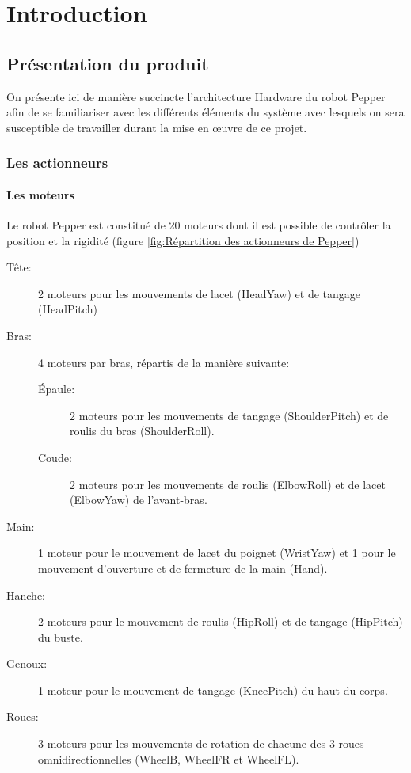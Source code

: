 \chapter{Introduction}
\label{Introduction}
\thispagestyle{fancy}

\section{Présentation du produit}
\label{Introduction:Présentation du produit}
On présente ici de manière succincte l'architecture Hardware du robot Pepper afin de se familiariser avec les différents éléments du système avec lesquels on sera susceptible de travailler durant la mise en œuvre de ce projet.  

\subsection{Les actionneurs}
\label{Introduction:Présentation du produit:Les actionneurs}
\subsubsection{Les moteurs}
\label{Introduction:Présentation du produit:Les actionneurs: Les moteurs}
Le robot Pepper est constitué de 20 moteurs dont il est possible de contrôler la position et la rigidité (figure \ref{fig:Répartition des actionneurs de Pepper})
\begin{description}
	\item [Tête:] 2 moteurs pour les mouvements de lacet (HeadYaw) et de tangage (HeadPitch)
	\item [Bras:] 4 moteurs par bras, répartis de la manière suivante: 
	\begin{description}
		\item [Épaule:] 2 moteurs pour les mouvements de tangage (ShoulderPitch) et de roulis du bras (ShoulderRoll).
		\item [Coude:] 2 moteurs pour les mouvements de roulis (ElbowRoll) et de lacet (ElbowYaw) de l'avant-bras.
	\end{description}
	\item [Main:] 1 moteur pour le mouvement de lacet du poignet (WristYaw) et 1 pour le mouvement d'ouverture et de fermeture de la main (Hand).
	\item [Hanche:] 2 moteurs pour le mouvement de roulis (HipRoll) et de tangage (HipPitch) du buste.
	\item [Genoux:] 1 moteur pour le mouvement de tangage (KneePitch) du haut du corps.
	\item [Roues:] 3 moteurs pour les mouvements de rotation de chacune des 3 roues omnidirectionnelles (WheelB, WheelFR et WheelFL).
\end{description}

